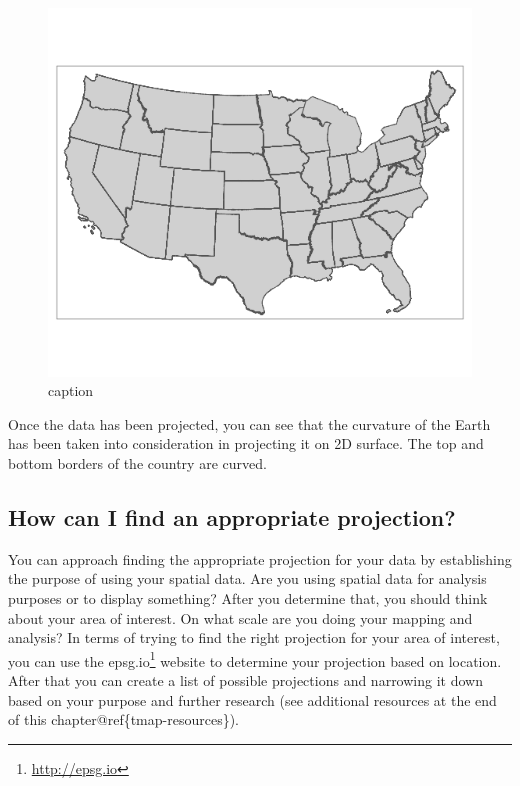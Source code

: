\documentclass[
  krantz2]{krantz}
\begin{document}
\begin{figure}
\centering
\includegraphics{tmap-images/projected.png}
\caption{caption}
\end{figure}

Once the data has been projected, you can see that the curvature of the Earth has been taken into consideration in projecting it on 2D surface. The top and bottom borders of the country are curved.

\hypertarget{how-can-i-find-an-appropriate-projection}{%
\subsection{How can I find an appropriate projection?}\label{how-can-i-find-an-appropriate-projection}}

You can approach finding the appropriate projection for your data by establishing the purpose of using your spatial data. Are you using spatial data for analysis purposes or to display something? After you determine that, you should think about your area of interest. On what scale are you doing your mapping and analysis? In terms of trying to find the right projection for your area of interest, you can use the epsg.io\footnote{\url{http://epsg.io}} website to determine your projection based on location. After that you can create a list of possible projections and narrowing it down based on your purpose and further research (see additional resources at the end of this chapter@ref\{tmap-resources\}).
\end{document}
